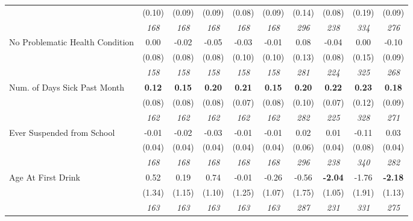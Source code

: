 \begin{tabular}{l c c c c c c c c c}
& (0.10) & (0.09) & (0.09) & (0.08) & (0.09) & (0.14) & (0.08) & (0.19) & (0.09) \\
& \textit{ 168 } & \textit{ 168 } & \textit{ 168 } & \textit{ 168 } & \textit{ 168 } & \textit{ 296 } & \textit{ 238 } & \textit{ 334 } & \textit{ 276 } \\
No Problematic Health Condition & 0.00 & -0.02 & -0.05 & -0.03 & -0.01 & 0.08 & -0.04 & 0.00 & -0.10 \\
& (0.08) & (0.08) & (0.08) & (0.10) & (0.10) & (0.13) & (0.08) & (0.15) & (0.09) \\
& \textit{ 158 } & \textit{ 158 } & \textit{ 158 } & \textit{ 158 } & \textit{ 158 } & \textit{ 281 } & \textit{ 224 } & \textit{ 325 } & \textit{ 268 } \\
Num. of Days Sick Past Month & \textbf{ 0.12 } & \textbf{ 0.15 } & \textbf{ 0.20 } & \textbf{0.21} & \textbf{0.15} & \textbf{ 0.20 } & \textbf{0.22} & \textbf{ 0.23 } & \textbf{0.18} \\
& (0.08) & (0.08) & (0.08) & (0.07) & (0.08) & (0.10) & (0.07) & (0.12) & (0.09) \\
& \textit{ 162 } & \textit{ 162 } & \textit{ 162 } & \textit{ 162 } & \textit{ 162 } & \textit{ 282 } & \textit{ 225 } & \textit{ 328 } & \textit{ 271 } \\
Ever Suspended from School & -0.01 & -0.02 & -0.03 & -0.01 & -0.01 & 0.02 & 0.01 & -0.11 & 0.03 \\
& (0.04) & (0.04) & (0.04) & (0.04) & (0.04) & (0.06) & (0.04) & (0.08) & (0.04) \\
& \textit{ 168 } & \textit{ 168 } & \textit{ 168 } & \textit{ 168 } & \textit{ 168 } & \textit{ 296 } & \textit{ 238 } & \textit{ 340 } & \textit{ 282 } \\
Age At First Drink & 0.52 & 0.19 & 0.74 & -0.01 & -0.26 & -0.56 & \textbf{-2.04} & -1.76 & \textbf{-2.18} \\
& (1.34) & (1.15) & (1.10) & (1.25) & (1.07) & (1.75) & (1.05) & (1.91) & (1.13) \\
& \textit{ 163 } & \textit{ 163 } & \textit{ 163 } & \textit{ 163 } & \textit{ 163 } & \textit{ 287 } & \textit{ 231 } & \textit{ 331 } & \textit{ 275 } \\
\bottomrule
\end{tabular}
